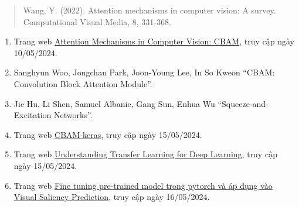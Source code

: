 \documentclass[
]{article}
\begin{document}
\begin{quote}
Wang, Y. (2022). Attention mechanisms in computer vision: A survey.
Computational Visual Media, 8, 331-368.
\end{quote}

\begin{enumerate}
\def\labelenumi{\arabic{enumi}.}
\setcounter{enumi}{7}
\item
  Trang web \ul{Attention Mechanisms in Computer Vision: CBAM}, truy cập
  ngày 10/05/2024.
\item
  Sanghyun Woo, Jongchan Park, Joon-Young Lee, In So Kweon ``CBAM:
  Convolution Block Attention Module''.
\item
  Jie Hu, Li Shen, Samuel Albanie, Gang Sun, Enhua Wu
  ``Squeeze-and-Excitation Networks''.
\item
  Trang web \ul{CBAM-keras}, truy cập ngày 15/05/2024.
\item
  Trang web \ul{Understanding Transfer Learning for Deep Learning}, truy
  cập ngày 15/05/2024.
\item
  Trang web \ul{Fine tuning pre-trained model trong pytorch và áp dụng
  vào} \ul{Visual Saliency Prediction}, truy cập ngày 16/05/2024.
\end{enumerate}
\end{document}
